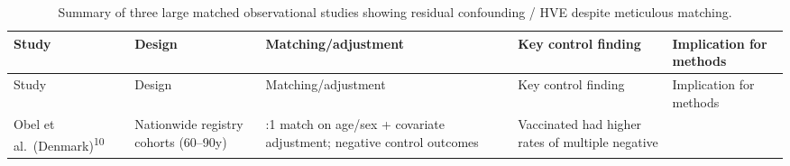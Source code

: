 \documentclass[
]{article}
\begin{document}
\begin{longtable}[]{@{}
  >{\raggedright\arraybackslash}p{}
  >{\raggedright\arraybackslash}p{}
  >{\raggedright\arraybackslash}p{}
  >{\raggedright\arraybackslash}p{}
  >{\raggedright\arraybackslash}p{}@{}}
\caption{Summary of three large matched observational studies showing
residual confounding / HVE despite meticulous
matching.}\label{tbl:HVE_motivation}\tabularnewline
\toprule\noalign{}
\begin{minipage}[b]{\linewidth}\raggedright
Study
\end{minipage} & \begin{minipage}[b]{\linewidth}\raggedright
Design
\end{minipage} & \begin{minipage}[b]{\linewidth}\raggedright
Matching/adjustment
\end{minipage} & \begin{minipage}[b]{\linewidth}\raggedright
Key control finding
\end{minipage} & \begin{minipage}[b]{\linewidth}\raggedright
Implication for methods
\end{minipage} \\
\midrule\noalign{}
\endfirsthead
\toprule\noalign{}
\begin{minipage}[b]{\linewidth}\raggedright
Study
\end{minipage} & \begin{minipage}[b]{\linewidth}\raggedright
Design
\end{minipage} & \begin{minipage}[b]{\linewidth}\raggedright
Matching/adjustment
\end{minipage} & \begin{minipage}[b]{\linewidth}\raggedright
Key control finding
\end{minipage} & \begin{minipage}[b]{\linewidth}\raggedright
Implication for methods
\end{minipage} \\
\midrule\noalign{}
\endhead
\bottomrule\noalign{}
\endlastfoot
Obel et al.~(Denmark)\textsuperscript{10} & Nationwide registry cohorts
(60--90y) & 1:1 match on age/sex + covariate adjustment; negative
control outcomes & Vaccinated had higher rates of multiple negative

\end{longtable}
\end{document}
